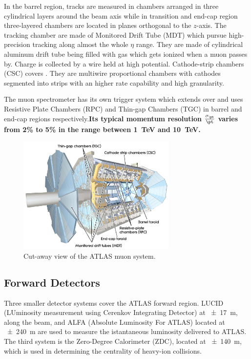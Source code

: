 In the barrel region, tracks are measured in chambers arranged in three cylindrical layers around the beam axis while in transition and end-cap region three-layered chambers are located in planes orthogonal to the $z$-axis. The tracking chamber are made of Monitored Drift Tube (MDT) which pursue high-precision tracking along almost the whole $\eta$ range. They are made of cylindrical aluminum drift tube being filled with gas which gets ionized when a muon passes by. Charge is collected by a wire held at high potential. Cathode-strip chambers (CSC) covers . They are multiwire proportional chambers with cathodes segmented into strips with an higher rate capability and high granularity.     

The muon spectrometer has its own trigger system which extends over  and uses Resistive Plate Chambers (RPC) and Thin-gap Chambers (TGC) in barrel and end-cap regions respectively.{\bfseries Its typical momentum resolution $\frac{\sigma_{\pt}}{\pt}$ varies from 2\% to 5\% in the range between \SI{1}{\TeV} and \SI{10}{\TeV}.}

\begin{figure}[pt]
\centering
\includegraphics[width=0.7\textwidth]{LHC_ATLAS/Muons}
\caption{Cut-away view of the ATLAS muon system.}
\label{fig:muons}
\end{figure}

\subsection{Forward Detectors}
Three smaller detector systems cover the ATLAS forward region. LUCID (LUminosity measurement using Cerenkov Integrating Detector) at \SI{\pm 17}{\m}, along the beam, and ALFA (Absolute Luminosity For ATLAS) located at \SI{\pm 240}{\m} are used to measure the istantaneous luminosity delivered to ATLAS. The third system is the Zero-Degree Calorimeter (ZDC), located at \SI{\pm 140}{\m}, which is used in determining the centrality of heavy-ion collisions.

